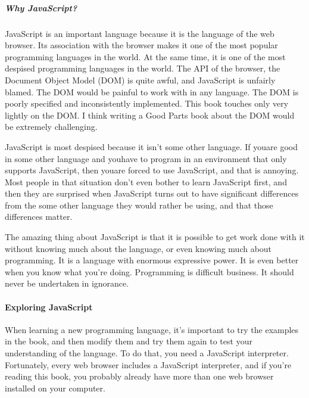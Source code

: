 \subparagraph*{Why JavaScript?}
\hfill \break
JavaScript is an important language because it is the language of the web browser. Its
association with the browser makes it one of the most popular programming languages
in the world. At the same time, it is one of the most despised programming
languages in the world. The API of the browser, the Document Object Model
(DOM) is quite awful, and JavaScript is unfairly blamed. The DOM would be painful
to work with in any language. The DOM is poorly specified and inconsistently
implemented. This book touches only very lightly on the DOM. I think writing a
Good Parts book about the DOM would be extremely challenging.


JavaScript is most despised because it isn’t some other language. If youare good in
some other language and youhave to program in an environment that only supports
JavaScript, then youare forced to use JavaScript, and that is annoying. Most people
in that situation don’t even bother to learn JavaScript first, and then they are surprised
when JavaScript turns out to have significant differences from the some other
language they would rather be using, and that those differences matter.


The amazing thing about JavaScript is that it is possible to get work done with it
without knowing much about the language, or even knowing much about programming.
It is a language with enormous expressive power. It is even better when you
know what you’re doing. Programming is difficult business. It should never be
undertaken in ignorance.

\paragraph*{Exploring JavaScript}
\hfill \break
When learning a new programming language, it’s important to try the examples in the
book, and then modify them and try them again to test your understanding of the
language. To do that, you need a JavaScript interpreter. Fortunately, every web browser
includes a JavaScript interpreter, and if you’re reading this book, you probably already
have more than one web browser installed on your computer.

